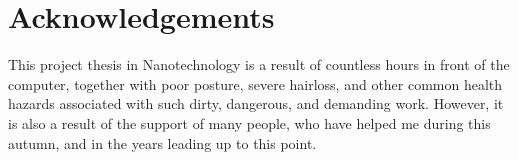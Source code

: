


\bigskip


\begingroup

\let\clearpage\relax
\let\cleardoublepage\relax
\let\cleardoublepage\relax

\chapter*{Acknowledgements}

% 
% 
% 
% 

\noindent
This project thesis in Nanotechnology is a result of countless hours in front of the computer, together with poor posture, severe hairloss,
and other common health hazards associated with such dirty, dangerous, and demanding work.
However, it is also a result of the support of many people, who have helped me during this autumn, and in the years leading up to this point.


